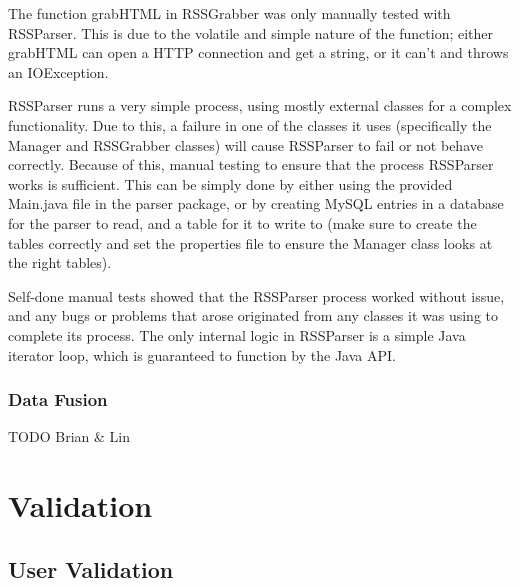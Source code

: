 \documentclass[11pt]{article} %
\begin{document}
The function grabHTML in RSSGrabber was only manually tested with RSSParser. This is due to the volatile and simple nature of the function; either grabHTML can open a HTTP connection and get a string, or it can’t and throws an IOException.

RSSParser runs a very simple process, using mostly external classes for a complex functionality. Due to this, a failure in one of the classes it uses (specifically the Manager and RSSGrabber classes) will cause RSSParser to fail or not behave correctly. Because of this, manual testing to ensure that the process RSSParser works is sufficient. This can be simply done by either using the provided Main.java file in the parser package, or by creating MySQL entries in a database for the parser to read, and a table for it to write to (make sure to create the tables correctly and set the properties file to ensure the Manager class looks at the right tables).

Self-done manual tests showed that the RSSParser process worked without issue, and any bugs or problems that arose originated from any classes it was using to complete its process. The only internal logic in RSSParser is a simple Java iterator loop, which is guaranteed to function by the Java API.

\subsubsection{Data Fusion}

TODO Brian \& Lin

\section{Validation}

\subsection{User Validation}
\end{document}
